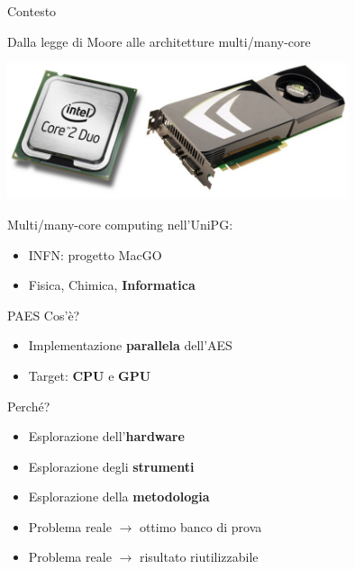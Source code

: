 \documentclass[11pt,xcolor=dvipsnames]{beamer}
\begin{document}
\begin{frame}{Contesto}

Dalla legge di Moore alle architetture multi/many-core

\vspace{1mm}
\begin{center}
\includegraphics[height=40mm]{img/cpu-gpu.png}
\end{center}

Multi/many-core computing nell'UniPG:

\begin{itemize}
\item INFN: progetto MacGO
\item Fisica, Chimica, \textbf{Informatica}
\end{itemize}
\end{frame}

\begin{frame}{PAES}
Cos'è?
\begin{itemize}
\item Implementazione \textbf{parallela} dell'AES
\item Target: \textbf{CPU} e \textbf{GPU}
\end{itemize}

\vspace{1cm}
Perché?
\begin{itemize}
\item Esplorazione dell'\textbf{hardware}
\item Esplorazione degli \textbf{strumenti}
\item Esplorazione della \textbf{metodologia}
\item Problema reale $\longrightarrow$ ottimo banco di prova
\item Problema reale $\longrightarrow$ risultato riutilizzabile
\end{itemize}
\end{frame}
\end{document}
